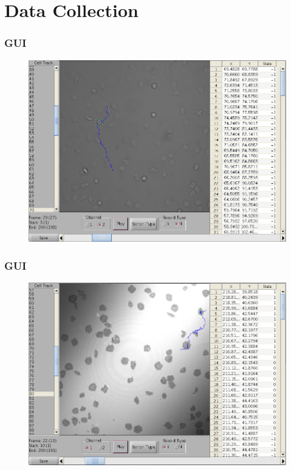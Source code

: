 \documentclass[8pt]{beamer}
\begin{document}
\section{Data Collection}  
\begin{frame}
  \frametitle{GUI}  
  
    \begin{figure}[H]\centering
    \includegraphics[width=.9\textwidth]{fig/sc1.png}
  \end{figure}
  
\end{frame}

\begin{frame}
  \frametitle{GUI}  
  
    \begin{figure}[H]\centering
    \includegraphics[width=.9\textwidth]{fig/sc2.png}
  \end{figure}
  
\end{frame}
\end{document}
